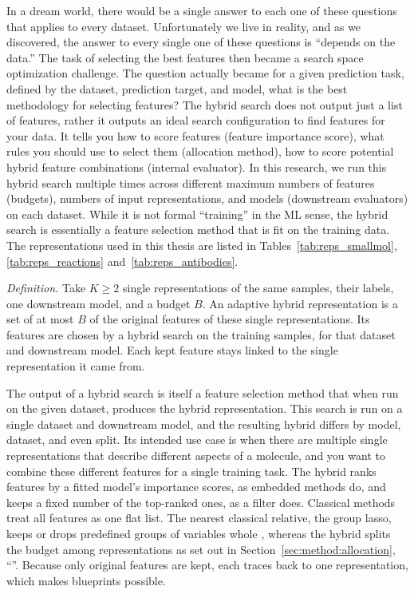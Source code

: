 In a dream world, there would be a single answer to each one of these questions that applies to every dataset. Unfortunately we live in reality, and as we discovered, the answer to every single one of these questions is ``depends on the data.'' The task of selecting the best features then became a search space optimization challenge. The question actually became for a given prediction task, defined by the dataset, prediction target, and model, what is the best methodology for selecting features? The hybrid search does not output just a list of features, rather it outputs an ideal search configuration to find features for your data. It tells you how to score features (feature importance score), what rules you should use to select them (allocation method), how to score potential hybrid feature combinations (internal evaluator). In this research, we run this hybrid search multiple times across different maximum numbers of features (budgets), numbers of input representations, and models (downstream evaluators) on each dataset. While it is not formal ``training'' in the ML sense, the hybrid search is essentially a feature selection method that is fit on the training data. The representations used in this thesis are listed in Tables~\ref{tab:reps_smallmol}, \ref{tab:reps_reactions} and~\ref{tab:reps_antibodies}.

\noindent\textit{Definition.} Take $K \ge 2$ single representations of the same samples, their labels, one downstream model, and a budget $B$. An adaptive hybrid representation is a set of at most $B$ of the original features of these single representations. Its features are chosen by a hybrid search on the training samples, for that dataset and downstream model. Each kept feature stays linked to the single representation it came from.

 The output of a hybrid search is itself a feature selection method that when run on the given dataset, produces the hybrid representation. This search is run on a single dataset and downstream model, and the resulting hybrid differs by model, dataset, and even split. Its intended use case is when there are multiple single representations that describe different aspects of a molecule, and you want to combine these different features for a single training task. The hybrid ranks features by a fitted model's importance scores, as embedded methods do, and keeps a fixed number of the top-ranked ones, as a filter does. Classical methods treat all features as one flat list. The nearest classical relative, the group lasso, keeps or drops predefined groups of variables whole \citep{Yuan2006}, whereas the hybrid splits the budget among representations as set out in Section~\ref{sec:method:allocation}, ``''. Because only original features are kept, each traces back to one representation, which makes blueprints possible.

